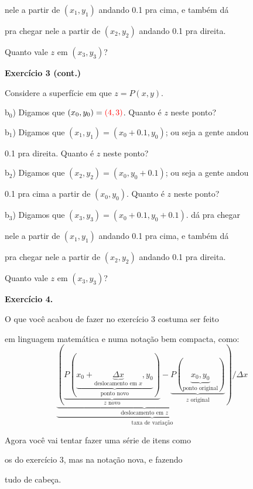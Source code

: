 \documentclass[oneside,12pt]{article}
\begin{document}
nele a partir de $(x_1,y_1)$ andando 0.1 pra cima, e também dá

pra chegar nele a partir de $(x_2,y_2)$ andando 0.1 pra direita.

Quanto vale $z$ em $(x_3,y_3)$?


\newpage

{\bf Exercício 3 (cont.)}

\msk

Considere a superfície em que $z=P(x,y)$.

\msk

\def\z#1{${}_#1$}

b\z0) Digamos que $(x_0,y_0)=\ColorRed{(4,3)}$. Quanto é $z$ neste ponto?

\msk

b\z1) Digamos que $(x_1,y_1) = (x_0+0.1,y_0)$; ou seja a gente andou

0.1 pra direita. Quanto é $z$ neste ponto?

\msk

b\z2) Digamos que $(x_2,y_2) = (x_0,y_0+0.1)$; ou seja a gente andou

0.1 pra cima a partir de $(x_0,y_0)$. Quanto é $z$ neste ponto?

\msk

b\z3) Digamos que $(x_3,y_3) = (x_0+0.1,y_0+0.1)$. dá pra chegar

nele a partir de $(x_1,y_1)$ andando 0.1 pra cima, e também dá

pra chegar nele a partir de $(x_2,y_2)$ andando 0.1 pra direita.

Quanto vale $z$ em $(x_3,y_3)$?


\newpage


{\bf Exercício 4.}

O que você acabou de fazer no exercício 3 costuma ser feito

em linguagem matemática e numa notação bem compacta, como:
%
\def\und#1#2{\underbrace{#1}_{\text{#2}}}
%
$$\und{
    \und{
    (\und{P(\und{x_0+\und{Δx}{deslocamento em $x$},y_0}{ponto novo})}{$z$ novo} -
     \und{P(\und{x_0,y_0}{ponto original})}{$z$ original})
    }{deslocamento em $z$}
    / Δx
   }{taxa de variação}
$$

Agora você vai tentar fazer uma série de itens como

os do exercício 3, mas na notação nova, e fazendo

tudo de cabeça.
\end{document}
